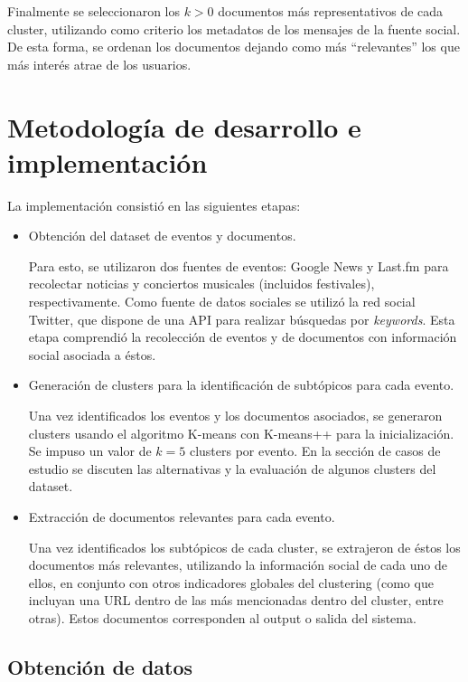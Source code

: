    Finalmente se seleccionaron los $k>0$ documentos más representativos de
   cada cluster, utilizando como criterio los metadatos de los
   mensajes de la fuente social. De esta forma, se ordenan los
   documentos dejando como más ``relevantes'' los que más interés atrae
   de los usuarios.

\section{Metodología de desarrollo e implementación}
\label{sec-4.2}

\label{impl}

   La implementación consistió en las siguientes etapas:

\begin{itemize}
\item Obtención del dataset de eventos y documentos.

     Para esto, se utilizaron dos fuentes de eventos: Google News y
     Last.fm para recolectar noticias y conciertos musicales
     (incluidos festivales), respectivamente. Como fuente de datos
     sociales se utilizó la red social Twitter, que dispone de una API
     para realizar búsquedas por \emph{keywords}. Esta etapa comprendió
     la recolección de eventos y de documentos con información social
     asociada a éstos.
\item Generación de clusters para la identificación de subtópicos para
     cada evento.

     Una vez identificados los eventos y los documentos asociados, se
     generaron clusters usando el algoritmo K-means con K-means++ para
     la inicialización. Se impuso un valor de $k=5$ clusters por
     evento. En la sección de casos de estudio se discuten las
     alternativas y la evaluación de algunos clusters del dataset.
\item Extracción de documentos relevantes para cada evento.

     Una vez identificados los subtópicos de cada cluster, se
     extrajeron de éstos los documentos más relevantes, utilizando la
     información social de cada uno de ellos, en conjunto con otros
     indicadores globales del clustering (como que incluyan una URL
     dentro de las más mencionadas dentro del cluster, entre
     otras). Estos documentos corresponden al output o salida del
     sistema.
\end{itemize}
\subsection{Obtención de datos}
\label{sec-4.2.1}

